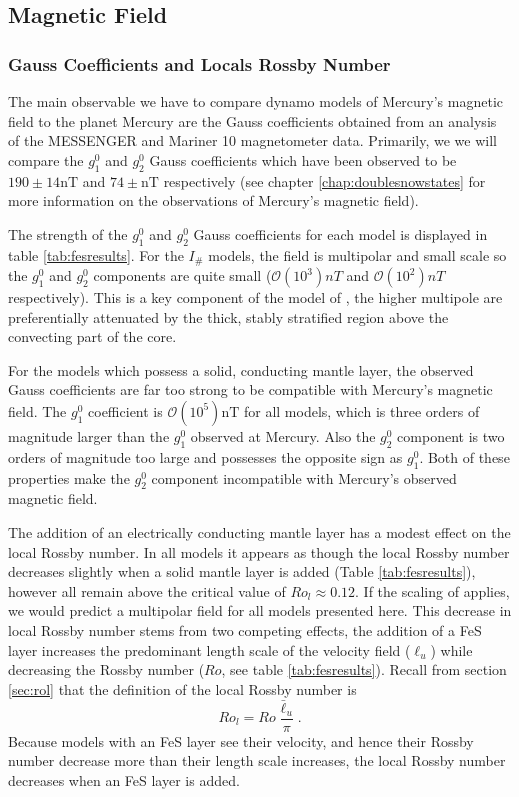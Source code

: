 \subsection{Magnetic Field}
\subsubsection{Gauss Coefficients and Locals Rossby Number}
The main observable we have to compare dynamo models of Mercury's magnetic field to the planet Mercury are the Gauss coefficients obtained from an analysis of the MESSENGER and Mariner 10 magnetometer data. Primarily, we we will compare the $g_1^0$ and $g_2^0$ Gauss coefficients which have been observed to be $190\pm14 \textrm{nT}$ and $74\pm \textrm{nT}$ respectively (see chapter \ref{chap:doublesnowstates} for more information on the observations of Mercury's magnetic field).

The strength of the $g_1^0$ and $g_2^0$ Gauss coefficients for each model is displayed in table \ref{tab:fesresults}. For the $I_{\#}$ models, the field is multipolar and small scale so the $g_1^0$ and $g_2^0$ components are quite small ($\mathcal{O}\left(10^{3}\right) nT$ and $\mathcal{O}\left(10^{2}\right) nT$ respectively). This is a key component of the model of \citet{christensen06}, the higher multipole are preferentially attenuated by the thick, stably stratified region above the convecting part of the core.

For the models which possess a solid, conducting mantle layer, the observed Gauss coefficients are far too strong to be compatible with Mercury's magnetic field. The $g_1^0$ coefficient is $\mathcal{O}\left(10^5\right) \textrm{nT}$ for all models, which is three orders of magnitude larger than the $g_1^0$ observed at Mercury. Also the $g_2^0$ component is two orders of magnitude too large and possesses the opposite sign as $g_1^0$. Both of these properties make the $g_2^0$ component incompatible with Mercury's observed magnetic field.

The addition of an electrically conducting mantle layer has a modest effect on the local Rossby number. In all models it appears as though the local Rossby number decreases slightly when a solid mantle layer is added (Table \ref{tab:fesresults}), however all remain above the critical value of $Ro_{l}\approx 0.12$. If the scaling of \citet{christensen06scaling} applies, we would predict a multipolar field for all models presented here. This decrease in local Rossby number stems from two competing effects, the addition of a FeS layer increases the predominant length scale of the velocity field ($\ell_u$) while decreasing the Rossby number ($Ro$, see table \ref{tab:fesresults}). Recall from section \ref{sec:rol} that the definition of the local Rossby number is
\begin{equation}
Ro_{l}=Ro\frac{\bar{\ell}_{u}}{\pi}.
\end{equation}
Because models with an FeS layer see their velocity, and hence their Rossby number decrease more than their length scale increases, the local Rossby number decreases when an FeS layer is added.

